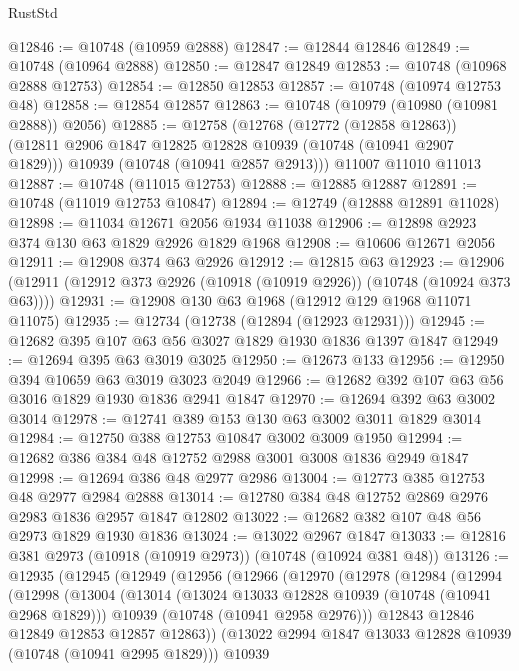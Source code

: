 \begin{lexlean}{RustStd}
\begin{coremodule}
{\begin{coremodule}
{{{{{@12846 := @10748 (@10959 @2888)
@12847 := @12844 @12846
@12849 := @10748 (@10964 @2888)
@12850 := @12847 @12849
@12853 := @10748 (@10968 @2888 @12753)
@12854 := @12850 @12853
@12857 := @10748 (@10974 @12753 @48)
@12858 := @12854 @12857
@12863 := @10748 (@10979 (@10980 (@10981 @2888)) @2056)
@12885 := @12758
    (@12768
      (@12772 (@12858 @12863))
      (@12811 @2906 @1847 @12825 @12828 @10939 (@10748 (@10941 @2907 @1829)))
      @10939
      (@10748 (@10941 @2857 @2913)))
    @11007
    @11010
    @11013
@12887 := @10748 (@11015 @12753)
@12888 := @12885 @12887
@12891 := @10748 (@11019 @12753 @10847)
@12894 := @12749 (@12888 @12891 @11028)
@12898 := @11034 @12671 @2056 @1934 @11038
@12906 := @12898 @2923 @374 @130 @63 @1829 @2926 @1829 @1968
@12908 := @10606 @12671 @2056
@12911 := @12908 @374 @63 @2926
@12912 := @12815 @63
@12923 := @12906 (@12911 (@12912 @373 @2926 (@10918 (@10919 @2926)) (@10748 (@10924 @373 @63))))
@12931 := @12908 @130 @63 @1968 (@12912 @129 @1968 @11071 @11075)
@12935 := @12734 (@12738 (@12894 (@12923 @12931)))
@12945 := @12682 @395 @107 @63 @56 @3027 @1829 @1930 @1836 @1397 @1847
@12949 := @12694 @395 @63 @3019 @3025
@12950 := @12673 @133
@12956 := @12950 @394 @10659 @63 @3019 @3023 @2049
@12966 := @12682 @392 @107 @63 @56 @3016 @1829 @1930 @1836 @2941 @1847
@12970 := @12694 @392 @63 @3002 @3014
@12978 := @12741 @389 @153 @130 @63 @3002 @3011 @1829 @3014
@12984 := @12750 @388 @12753 @10847 @3002 @3009 @1950
@12994 := @12682 @386 @384 @48 @12752 @2988 @3001 @3008 @1836 @2949 @1847
@12998 := @12694 @386 @48 @2977 @2986
@13004 := @12773 @385 @12753 @48 @2977 @2984 @2888
@13014 := @12780 @384 @48 @12752 @2869 @2976 @2983 @1836 @2957 @1847 @12802
@13022 := @12682 @382 @107 @48 @56 @2973 @1829 @1930 @1836
@13024 := @13022 @2967 @1847
@13033 := @12816 @381 @2973 (@10918 (@10919 @2973)) (@10748 (@10924 @381 @48))
@13126 := @12935
    (@12945
      (@12949
        (@12956
          (@12966
            (@12970
              (@12978
                (@12984
                  (@12994
                    (@12998
                      (@13004
                        (@13014
                          (@13024 @13033 @12828 @10939 (@10748 (@10941 @2968 @1829)))
                          @10939
                          (@10748 (@10941 @2958 @2976)))
                        @12843
                        @12846
                        @12849
                        @12853
                        @12857
                        @12863))
                    (@13022 @2994 @1847 @13033 @12828 @10939 (@10748 (@10941 @2995 @1829)))
                    @10939
}}}}}
\end{coremodule}}
\end{coremodule}
\end{lexlean}
